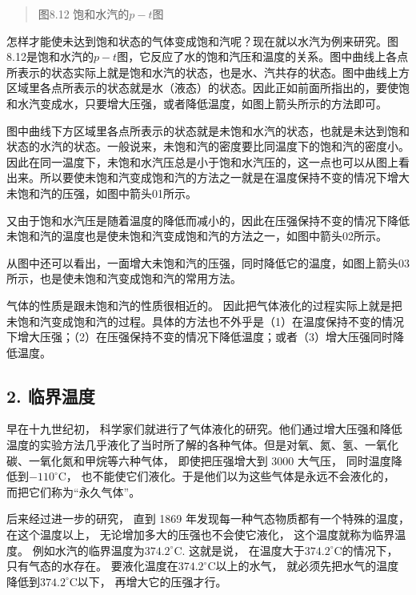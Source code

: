 \begin{quote}
图8.12 饱和水汽的\(p - t\)图
\end{quote}

怎样才能使未达到饱和状态的气体变成饱和汽呢？现在就以水汽为例来研究。图8.12是饱和水汽的\(p - t\)图，它反应了水的饱和汽压和温度的关系。图中曲线上各点所表示的状态实际上就是饱和水汽的状态，也是水、汽共存的状态。图中曲线上方区域里各点所表示的状态就是水（液态）的状态。因此正如前面所指出的，要使饱和水汽变成水，只要增大压强，或者降低温度，如图上箭头所示的方法即可。

图中曲线下方区域里各点所表示的状态就是未饱和水汽的状态，也就是未达到饱和状态的水汽的状态。一般说来，未饱和汽的密度要比同温度下的饱和汽的密度小。因此在同一温度下，未饱和水汽压总是小于饱和水汽压的，这一点也可以从图上看出来。所以要使未饱和汽变成饱和汽的方法之一就是在温度保持不变的情况下增大未饱和汽的压强，如图中箭头01所示。

又由于饱和水汽压是随着温度的降低而减小的，因此在压强保持不变的情况下降低未饱和汽的温度也是使未饱和汽变成饱和汽的方法之一，如图中箭头02所示。

从图中还可以看出，一面增大未饱和汽的压强，同时降低它的温度，如图上箭头03所示，也是使未饱和汽变成饱和汽的常用方法。

气体的性质是跟未饱和汽的性质很相近的。
因此把气体液化的过程实际上就是把未饱和汽变成饱和汽的过程。具体的方法也不外乎是（1）在温度保持不变的情况下增大压强；（2）在压强保持不变的情况下降低温度；或者（3）增大压强同时降低温度。

\subsection{2. 临界温度}\label{ux4e34ux754cux6e29ux5ea6}

早在十九世纪初，
科学家们就进行了气体液化的研究。他们通过增大压强和降低温度的实验方法几乎液化了当时所了解的各种气体。但是对氧、氮、氢、一氧化碳、一氧化氮和甲烷等六种气体，
即使把压强增大到 3000 大气压，
同时温度降低到\(-110^{\circ}\mathrm{C}\)，
也不能使它们液化。于是他们以为这些气体是永远不会液化的，
而把它们称为``永久气体''。

后来经过进一步的研究， 直到 1869
年发现每一种气态物质都有一个特殊的温度， 在这个温度以上，
无论增加多大的压强也不会使它液化， 这个温度就称为临界温度。
例如水汽的临界温度为\(374.2^{\circ} \mathrm{C}\). 这就是说，
在温度大于\(374.2^{\circ} \mathrm{C}\)的情况下， 只有气态的水存在。
要液化温度在\(374.2^{\circ} \mathrm{C}\)以上的水气，
就必须先把水气的温度降低到\(374.2^{\circ} \mathrm{C}\)以下，
再增大它的压强才行。


